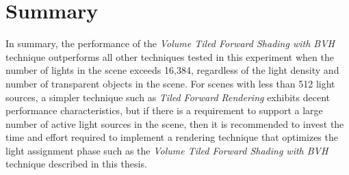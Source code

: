 \section{Summary}

In summary, the performance of the \emph{Volume Tiled Forward Shading with BVH} technique outperforms all other techniques tested in this experiment when the number of lights in the scene exceeds 16,384, regardless of the light density and number of transparent objects in the scene. For scenes with less than 512 light sources, a simpler technique such as \emph{Tiled Forward Rendering} exhibits decent performance characteristics, but if there is a requirement to support a large number of active light sources in the scene, then it is recommended to invest the time and effort required to implement a rendering technique that optimizes the light assignment phase such as the \emph{Volume Tiled Forward Shading with BVH} technique described in this thesis.